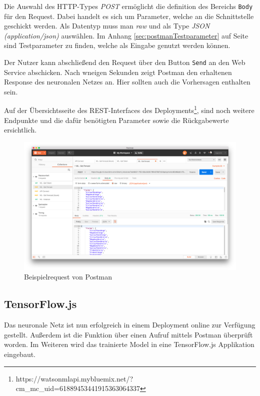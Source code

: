 Die Auswahl des HTTP-Types \textit{POST} ermöglicht die definition des Bereichs \texttt{Body} für den Request. Dabei
handelt es sich um Parameter, welche an die Schnittstelle geschickt werden. Als Datentyp muss man \textit{raw} und als
Type \textit{JSON (application/json)} auswählen. Im Anhang \ref{sec:postmanTestparameter} auf Seite
\pageref{sec:postmanTestparameter} sind Testparameter zu finden, welche als Eingabe genutzt werden können.

Der Nutzer kann abschließend den Request über den Button \texttt{Send} an den Web Service abschicken. Nach wneigen
Sekunden zeigt Postman den erhaltenen Response des neuronalen Netzes an. Hier sollten auch die Vorhersagen enthalten sein.

Auf der Übersichtsseite des REST-Interfaces des
Deployments\footnote{https://watson\-ml\-api.mybluemix.net/?cm\_mc\_uid=61889453441915363064337}, sind noch weitere
Endpunkte und die dafür benötigten Parameter sowie die Rückgabewerte ersichtlich.

\begin{figure}[h]
    \centering
    \includegraphics[scale=0.26]{images/kapitel_3/deployment_postman.png}
    \caption{Beispielrequest von Postman}
    \label{fig:umsetzung_deployment_postman}
\end{figure}

\subsection{TensorFlow.js}
Das neuronale Netz ist nun erfolgreich in einem Deployment online zur Verfügung gestellt. Außerdem ist die Funktion
über einen Aufruf mittels Postman überprüft worden. Im Weiteren wird das trainierte Model in eine TensorFlow.js
Applikation eingebaut.

